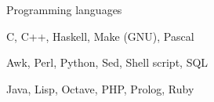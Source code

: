 \begin {rubric} {Programming languages}

\entry* [Advanced]
C, C++, Haskell, Make (GNU), Pascal

\entry* [Intermediate]
Awk, Perl, Python, Sed, Shell script, SQL

\entry* [Basic]
Java, Lisp, Octave, PHP, Prolog, Ruby

\end{rubric}
